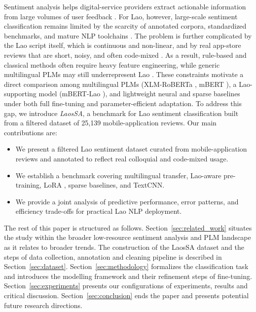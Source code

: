 \documentclass[conference, onecolumn]{IEEEtran}
\begin{document}
Sentiment analysis helps digital-service providers extract actionable information from large volumes of user feedback \cite{tan2023survey,alahmadi2025generalizing,10.1007/978-3-032-21625-0_12}. For Lao, however, large-scale sentiment classification remains limited by the scarcity of annotated corpora, standardized benchmarks, and mature NLP toolchains \cite{lin2022laoplm,nguyen2025semi,phatthiyaphaibun_2022_6833407}. The problem is further complicated by the Lao script itself, which is continuous and non-linear, and by real app-store reviews that are short, noisy, and often code-mixed \cite{nguyen2025semi,subramanian2025kec_tech_titans,chowdhury2025mysticciol,durairaj2025overview}. As a result, rule-based and classical methods often require heavy feature engineering, while generic multilingual PLMs may still underrepresent Lao \cite{lin2022laoplm}. These constraints motivate a direct comparison among multilingual PLMs (XLM-RoBERTa \cite{conneau2020unsupervised}, mBERT \cite{devlin2019bert}), a Lao-supporting model (mBERT-Lao \cite{lin2022laoplm}), and lightweight neural and sparse baselines under both full fine-tuning and parameter-efficient adaptation. To address this gap, we introduce \textit{LaosSA}, a benchmark for Lao sentiment classification built from a filtered dataset of 25,139 mobile-application reviews. Our main contributions are:
\begin{itemize}
\item We present a filtered Lao sentiment dataset curated from mobile-application reviews and annotated to reflect real colloquial and code-mixed usage.
\item We establish a benchmark covering multilingual transfer, Lao-aware pre-training, LoRA \cite{hu2022lora}, sparse baselines, and TextCNN.
\item We provide a joint analysis of predictive performance, error patterns, and efficiency trade-offs for practical Lao NLP deployment.
\end{itemize}
The rest of this paper is structured as follows. Section~\ref{sec:related_work} situates the study within the broader low-resource sentiment analysis and PLM landscape as it relates to broader trends. The construction of the LaosSA dataset and the steps of data collection, annotation and cleaning pipeline is described in Section~\ref{sec:dataset}. Section~\ref{sec:methodology} formalizes the classification task and introduces the modelling framework and their refinement steps of fine-tuning. Section~\ref{sec:experiments} presents our configurations of experiments, results and critical discussion. Section~\ref{sec:conclusion} ends the paper and presents potential future research directions.
\end{document}
